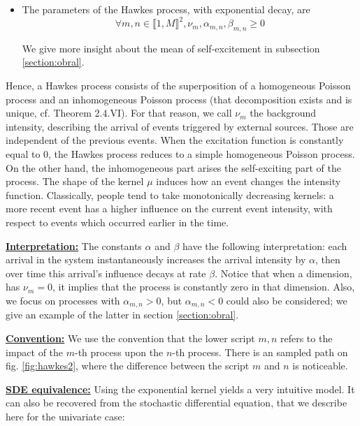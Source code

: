 \documentclass[11pt]{book}
\begin{document}
\begin{definition}
\begin{itemize}
\item The parameters of the Hawkes process, with exponential decay, are $$ \forall m,n \in \llbracket 1, M \rrbracket^2, \nu_m, \alpha_{m,n}, \beta_{m,n} \geq 0$$


We give more insight about the mean of self-excitement in subsection \ref{section:obral}.
\end{itemize}
\end{definition}


Hence, a Hawkes process consists of the superposition of a homogeneous Poisson process and an inhomogeneous Poisson process (that decomposition exists and is unique, cf. \cite{daley} Theorem 2.4.VI). For that reason, we call $\nu_m$ the background intensity, describing the arrival of events triggered by external sources. Those are independent of the previous events. When the excitation function is constantly equal to $0$, the Hawkes process reduces to a simple homogeneous Poisson process. On the other hand, the inhomogeneous part arises the self-exciting part of the process. The shape of the kernel $\mu$ induces how an event changes the intensity function. Classically, people tend to take monotonically decreasing kernels: a more recent event has a higher influence on the current event intensity, with respect to events which occurred earlier in the time.

\vspace{0.5cm}

\underline{\textbf{Interpretation:}} The constants $\alpha$ and $\beta$ have the following interpretation: each arrival in the system instantaneously increases the arrival intensity by $\alpha$, then over time this arrival's influence decays at rate $\beta$.
Notice that when a dimension, has $\nu_m = 0$, it implies that the process is constantly zero in that dimension. Also, we focus on processes with $\alpha_{m,n} > 0$, but $\alpha_{m,n} < 0$ could also be considered; we give an example of the latter in section \ref{section:obral}. 

\vspace{0.5cm}

\underline{\textbf{Convention:}} We use the convention that the lower script $m,n$ refers to the impact of the $m$-th process upon the $n$-th process. There is an sampled path on fig. \ref{fig:hawkes2}, where the difference between the script $m$ and $n$ is noticeable.

\vspace{0.5cm}

\underline{\textbf{SDE equivalence:}} Using the exponential kernel yields a very intuitive model. It can also be recovered from the stochastic differential equation, that we describe here for the univariate case:
\end{document}
